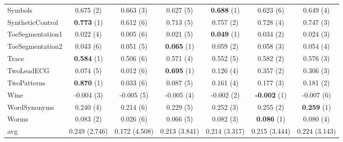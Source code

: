 \begin{table}[ht]
\begin{adjustbox}{width=\textwidth}
\begin{tabular}{lcccccc}
    Symbols & 0.675 (2) & 0.663 (3) & 0.627 (5) & \textbf{0.688} (1) & 0.623 (6) & 0.649 (4) \\
    SyntheticControl & \textbf{0.773} (1) & 0.612 (6) & 0.713 (5) & 0.757 (2) & 0.728 (4) & 0.747 (3) \\
    ToeSegmentation1 & 0.022 (4) & 0.005 (6) & 0.021 (5) & \textbf{0.049} (1) & 0.034 (2) & 0.024 (3) \\
    ToeSegmentation2 & 0.043 (6) & 0.051 (5) & \textbf{0.065} (1) & 0.059 (2) & 0.058 (3) & 0.054 (4) \\
    Trace & \textbf{0.584} (1) & 0.506 (6) & 0.571 (4) & 0.552 (5) & 0.582 (2) & 0.576 (3) \\
    TwoLeadECG & 0.074 (5) & 0.012 (6) & \textbf{0.695} (1) & 0.126 (4) & 0.357 (2) & 0.306 (3) \\
    TwoPatterns & \textbf{0.870} (1) & 0.033 (6) & 0.087 (5) & 0.161 (4) & 0.177 (3) & 0.181 (2) \\
    Wine & -0.004 (3) & -0.005 (5) & -0.005 (4) & -0.002 (2) & \textbf{-0.002} (1) & -0.007 (6) \\
    WordSynonyms & 0.240 (4) & 0.214 (6) & 0.229 (5) & 0.252 (3) & 0.255 (2) & \textbf{0.259} (1) \\
    Worms & 0.083 (2) & 0.026 (6) & 0.066 (5) & 0.082 (3) & \textbf{0.086} (1) & 0.080 (4) \\
    \hline 
    avg & 0.249 (2.746) & 0.172 (4.508) & 0.213 (3.841) & 0.214 (3.317) & 0.215 (3.444) & 0.224 (3.143) \\ 
    \hline
    \end{tabular}
    \end{adjustbox}
    \end{table}


